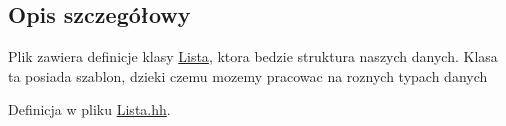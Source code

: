 \subsection{Opis szczegółowy}
Plik zawiera definicje klasy \hyperlink{class_lista}{Lista}, ktora bedzie struktura naszych danych. Klasa ta posiada szablon, dzieki czemu mozemy pracowac na roznych typach danych 

Definicja w pliku \hyperlink{_lista_8hh_source}{Lista.hh}.


